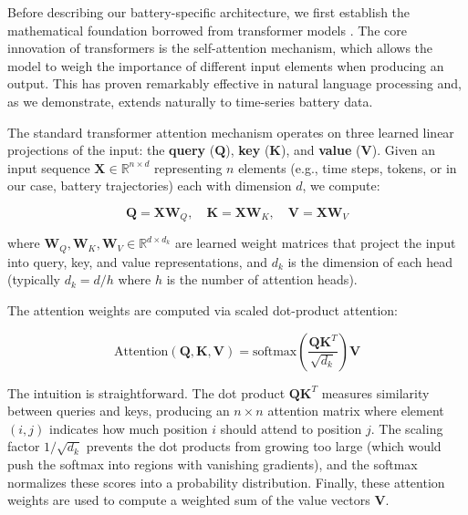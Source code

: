 \documentclass[5p,times,authoryear]{elsarticle}
\begin{document}
Before describing our battery-specific architecture, we first establish the mathematical foundation borrowed from transformer models \citep{vaswani2017attention}. The core innovation of transformers is the self-attention mechanism, which allows the model to weigh the importance of different input elements when producing an output. This has proven remarkably effective in natural language processing and, as we demonstrate, extends naturally to time-series battery data.

The standard transformer attention mechanism operates on three learned linear projections of the input: the \textbf{query} ($\mathbf{Q}$), \textbf{key} ($\mathbf{K}$), and \textbf{value} ($\mathbf{V}$). Given an input sequence $\mathbf{X} \in \mathbb{R}^{n \times d}$ representing $n$ elements (e.g., time steps, tokens, or in our case, battery trajectories) each with dimension $d$, we compute:

\begin{equation}
\mathbf{Q} = \mathbf{X}\mathbf{W}_Q, \quad \mathbf{K} = \mathbf{X}\mathbf{W}_K, \quad \mathbf{V} = \mathbf{X}\mathbf{W}_V
\label{eq:transformer_projections}
\end{equation}

where $\mathbf{W}_Q, \mathbf{W}_K, \mathbf{W}_V \in \mathbb{R}^{d \times d_k}$ are learned weight matrices that project the input into query, key, and value representations, and $d_k$ is the dimension of each head (typically $d_k = d/h$ where $h$ is the number of attention heads).

The attention weights are computed via scaled dot-product attention:

\begin{equation}
\text{Attention}(\mathbf{Q}, \mathbf{K}, \mathbf{V}) = \text{softmax}\left(\frac{\mathbf{Q}\mathbf{K}^T}{\sqrt{d_k}}\right)\mathbf{V}
\label{eq:scaled_attention}
\end{equation}

The intuition is straightforward. The dot product $\mathbf{Q}\mathbf{K}^T$ measures similarity between queries and keys, producing an $n \times n$ attention matrix where element $(i,j)$ indicates how much position $i$ should attend to position $j$. The scaling factor $1/\sqrt{d_k}$ prevents the dot products from growing too large (which would push the softmax into regions with vanishing gradients), and the softmax normalizes these scores into a probability distribution. Finally, these attention weights are used to compute a weighted sum of the value vectors $\mathbf{V}$.
\end{document}
